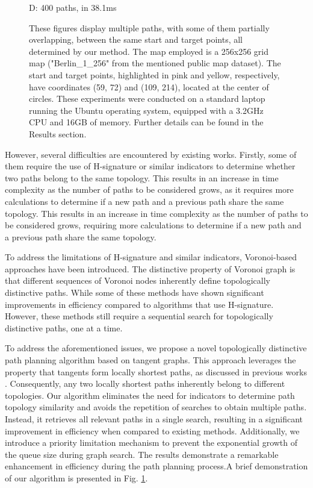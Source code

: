 \documentclass[lettersize,journal]{IEEEtran}
\begin{document}
\begin{figure}[t]
\begin{minipage}{.48\linewidth}
  \centerline{D: 400 paths, in 38.1ms}
\end{minipage}
\vfill
\caption{These figures display multiple paths, with some of them partially overlapping, between the same start and target points, all determined by our method. The map employed is a 256x256 grid map ("Berlin\_1\_256" from the mentioned public map dataset). The start and target points, highlighted in pink and yellow, respectively, have coordinates (59, 72) and (109, 214), located at the center of circles. These experiments were conducted on a standard laptop running the Ubuntu operating system, equipped with a 3.2GHz CPU and 16GB of memory. Further details can be found in the Results section. }
\label{examples}
\end{figure}

However, several difficulties are encountered by existing works. Firstly, some of them require the use of H-signature\cite{bhattacharya2012search, bhattacharya2012topological} or similar indicators to determine whether two paths belong to the same topology. This results in an increase in time complexity as the number of paths to be considered grows, as it requires more calculations to determine if a new path and a previous path share the same topology. This results in an increase in time complexity as the number of paths to be considered grows, requiring more calculations to determine if a new path and a previous path share the same topology.

To address the limitations of H-signature\cite{bhattacharya2012search, bhattacharya2012topological} and similar indicators, Voronoi-based approaches\cite{kuderer2014online, palmieri2015fast} have been introduced. The distinctive property of Voronoi graph is that different sequences of Voronoi nodes inherently define topologically distinctive paths. While some of these methods have shown significant improvements in efficiency compared to algorithms that use H-signature. However, these methods still require a sequential search for topologically distinctive paths, one at a time.

To address the aforementioned issues, we propose a novel topologically distinctive path planning algorithm based on tangent graphs. This approach leverages the property that tangents form locally shortest paths, as discussed in previous works \cite{liu1991proposal, liu1992path, yao2019reinforcedrimjump}. Consequently, any two locally shortest paths inherently belong to different topologies. Our algorithm eliminates the need for indicators to determine path topology similarity and avoids the repetition of searches to obtain multiple paths. Instead, it retrieves all relevant paths in a single search, resulting in a significant improvement in efficiency when compared to existing methods. Additionally, we introduce a priority limitation mechanism to prevent the exponential growth of the queue size during graph search. The results demonstrate a remarkable enhancement in efficiency during the path planning process.A brief demonstration of our algorithm is presented in Fig. \ref{examples}.
\end{document}
